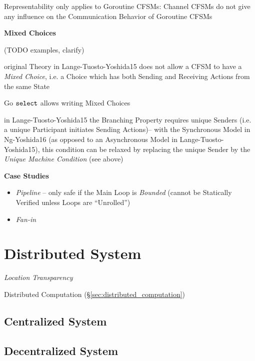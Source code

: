 Representability only applies to Goroutine CFSMs: Channel CFSMs do not
give any influence on the Communication Behavior of Goroutine CFSMs


\textbf{Mixed Choices}

(TODO examples, clarify)

original Theory in Lange-Tuosto-Yoshida15 does not allow a CFSM to
have a \emph{Mixed Choice}, i.e. a Choice which has both Sending and
Receiving Actions from the same State

Go $\mathtt{select}$ allows writing Mixed Choices

in Lange-Tuosto-Yoshida15 the Branching Property requires unique
Senders (i.e. a unique Participant initiates Sending Actions)-- with
the Synchronous Model in Ng-Yoshida16 (as opposed to an Asynchronous
Model in Lange-Tuosto-Yoshida15), this condition can be relaxed by
replacing the unique Sender by the \emph{Unique Machine Condition}
(see above)


\textbf{Case Studies}

\begin{itemize}
  \item \emph{Pipeline} -- only safe if the Main Loop is
    \emph{Bounded} (cannot be Statically Verified unless Loops are
    ``Unrolled'')
  \item \emph{Fan-in}
\end{itemize}



\section{Distributed System}\label{sec:distributed_system}

\emph{Location Transparency}

\fist Distributed Computation (\S\ref{sec:distributed_computation})



\subsection{Centralized System}\label{sec:centralized_system}

\subsection{Decentralized System}\label{sec:decentralized_system}



